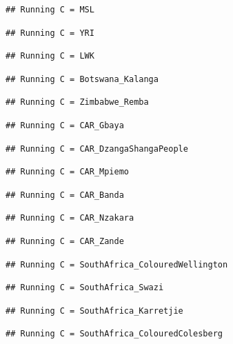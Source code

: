\documentclass[
]{article}
\begin{document}
\begin{verbatim}
## Running C = MSL
\end{verbatim}

\begin{verbatim}
## Running C = YRI
\end{verbatim}

\begin{verbatim}
## Running C = LWK
\end{verbatim}

\begin{verbatim}
## Running C = Botswana_Kalanga
\end{verbatim}

\begin{verbatim}
## Running C = Zimbabwe_Remba
\end{verbatim}

\begin{verbatim}
## Running C = CAR_Gbaya
\end{verbatim}

\begin{verbatim}
## Running C = CAR_DzangaShangaPeople
\end{verbatim}

\begin{verbatim}
## Running C = CAR_Mpiemo
\end{verbatim}

\begin{verbatim}
## Running C = CAR_Banda
\end{verbatim}

\begin{verbatim}
## Running C = CAR_Nzakara
\end{verbatim}

\begin{verbatim}
## Running C = CAR_Zande
\end{verbatim}

\begin{verbatim}
## Running C = SouthAfrica_ColouredWellington
\end{verbatim}

\begin{verbatim}
## Running C = SouthAfrica_Swazi
\end{verbatim}

\begin{verbatim}
## Running C = SouthAfrica_Karretjie
\end{verbatim}

\begin{verbatim}
## Running C = SouthAfrica_ColouredColesberg
\end{verbatim}
\end{document}

